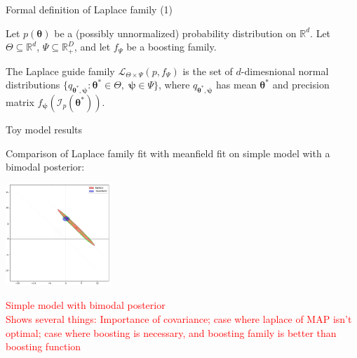 \documentclass[
  ignorenonframetext,
]{beamer}
\begin{document}
\begin{frame}{Formal definition of Laplace family (1)}
\protect\hypertarget{formal-definition-of-laplace-family-1}{}

Let \(p(\bm{\theta})\) be a (possibly unnormalized) probability
distribution on \(\mathbb{R}^d\). Let \(\Theta \subseteq \mathbb{R}^d\),
\(\Psi \subseteq \mathbb{R}^D_+\), and let \(f_\Psi\) be a boosting
family.

The Laplace guide family \(\mathcal{L}_{\Theta\times\Psi} (p,f_\Psi)\)
is the set of \(d\)-dimesnional normal distributions
\(\{q_{\bm{\theta}^*,\bm{\psi}}:\bm{\theta}^*\in\Theta,\;\bm{\psi}\in\Psi\}\),
where \(q_{\bm{\theta}^*,\bm{\psi}}\) has mean \(\bm{\theta}^*\) and
precision matrix
\(f_{\bm{\psi}} \left(\mathcal{I}_p(\bm{\theta}^*)\right)\).

\end{frame}

\begin{frame}{Toy model results}
\protect\hypertarget{toy-model-results}{}

Comparison of Laplace family fit with meanfield fit on simple model with
a bimodal posterior:

\begin{center}\includegraphics[width=150px]{simplegraph} \end{center}

\textcolor{red}{{\scriptsize Simple model with bimodal posterior\\Shows several things: Importance of covariance; case where laplace of MAP isn't optimal; case where boosting is necessary, and boosting family is better than boosting function}}

\end{frame}
\end{document}
